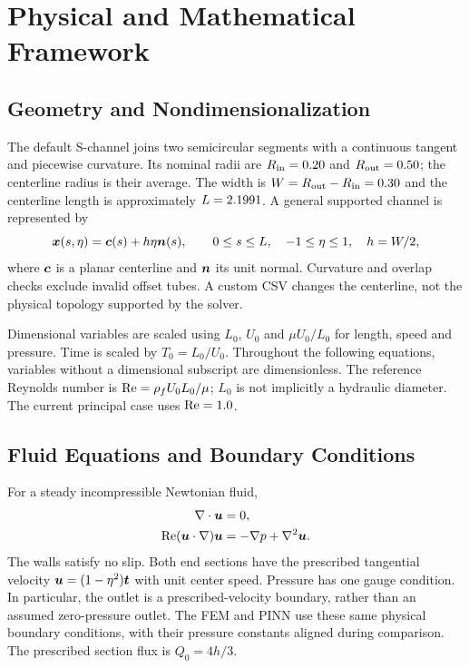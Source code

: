 \chapter{Physical and Mathematical Framework}
\label{ch:theory}
\section{Geometry and Nondimensionalization}
The default S-channel joins two semicircular segments with a continuous
tangent and piecewise curvature. Its nominal radii are
$R_{\rm in}=0.20$ and $R_{\rm out}=0.50$; the centerline
radius is their average. The width is $W=R_{\rm out}-R_{\rm in}=0.30$
and the centerline length is approximately $L=2.1991$.
A general supported channel is represented by
\begin{equation}
 \boldsymbol{x}(s,\eta)=\boldsymbol{c}(s)+h\eta\boldsymbol{n}(s),\qquad
 0\le s\le L,\quad -1\le\eta\le1,\quad h=W/2,
 \label{eq:geometry}
\end{equation}
where $\boldsymbol{c}$ is a planar centerline and $\boldsymbol{n}$ its unit normal.
Curvature and overlap checks exclude invalid offset tubes. A custom CSV
changes the centerline, not the physical topology supported by the solver.

Dimensional variables are scaled using $L_0$, $U_0$ and $\mu U_0/L_0$ for
length, speed and pressure. Time is scaled by $T_0=L_0/U_0$. Throughout the
following equations, variables without a dimensional subscript are
dimensionless. The reference Reynolds number is
$\mathrm{Re}=\rho_f U_0 L_0/\mu$; $L_0$ is not implicitly a hydraulic diameter.
The current principal case uses $\mathrm{Re}=1.0$.


\section{Fluid Equations and Boundary Conditions}
For a steady incompressible Newtonian fluid,
\begin{align}
 \nabla\cdot\boldsymbol{u}&=0,\label{eq:continuity}\\
 \mathrm{Re}(\boldsymbol{u}\cdot\nabla)\boldsymbol{u}&=-\nabla p+\nabla^2\boldsymbol{u}.
 \label{eq:momentum}
\end{align}
The walls satisfy no slip. Both end sections have the prescribed tangential
velocity $\boldsymbol{u}=(1-\eta^2)\boldsymbol{t}$ with unit center speed. Pressure has
one gauge condition. In particular, the outlet is a prescribed-velocity
boundary, rather than an assumed zero-pressure outlet. The FEM and PINN use
these same physical boundary conditions, with their pressure constants
aligned during comparison. The prescribed section flux is $Q_0=4h/3$.

